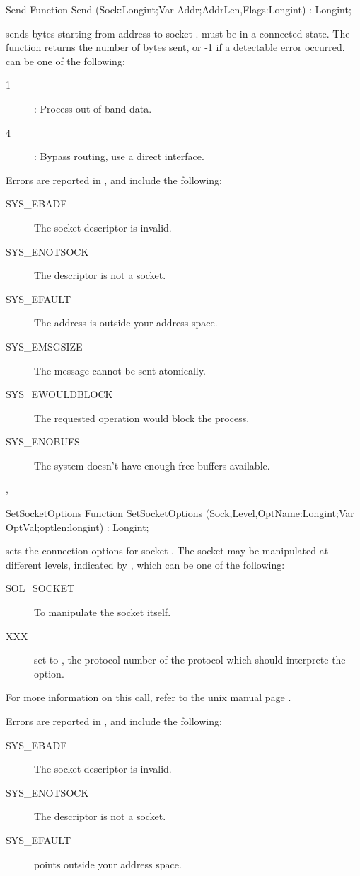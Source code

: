 \begin{function}{Send}
\Declaration
Function Send (Sock:Longint;Var Addr;AddrLen,Flags:Longint) : Longint;

\Description
{} sends  bytes starting from address 
to socket .  must be in a connected state.
The function returns the number of bytes sent, or -1 if a detectable 
error occurred.
 can be one of the following:
\begin{description}
\item [1] : Process out-of band data.
\item [4] : Bypass routing, use a direct interface.
\end{description}

\Errors
Errors are reported in , and include the following:
\begin{description}
\item[SYS\_EBADF] The socket descriptor is invalid.
\item[SYS\_ENOTSOCK] The descriptor is not a socket.
\item[SYS\_EFAULT] The address is outside your address space.
\item[SYS\_EMSGSIZE] The message cannot be sent atomically.
\item[SYS\_EWOULDBLOCK] The requested operation would block the process.
\item[SYS\_ENOBUFS] The system doesn't have enough free buffers available.
\end{description}

\SeeAlso
{}, 
\end{function}
\begin{function}{SetSocketOptions}
\Declaration
Function SetSocketOptions (Sock,Level,OptName:Longint;Var OptVal;optlen:longint) : Longint;

\Description
{} sets the connection options for socket .
The socket may be manipulated at different levels, indicated by ,
which can be one of the following:
\begin{description}
\item[SOL\_SOCKET] To manipulate the socket itself. 
\item[XXX] set  to , the protocol number of the protocol
which should interprete the option.
 \end{description}
For more information on this call, refer to the unix manual page .

\Errors
Errors are reported in , and include the following:
\begin{description}
\item[SYS\_EBADF] The socket descriptor is invalid.
\item[SYS\_ENOTSOCK] The descriptor is not a socket.
\item[SYS\_EFAULT]  points outside your address space.
\end{description}

\SeeAlso
{}
\end{function}
